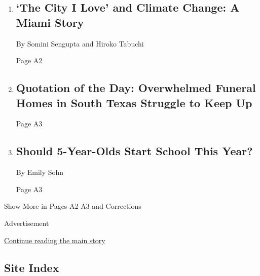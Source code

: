 \begin{enumerate}
\def\labelenumi{\arabic{enumi}.}
\item
  \href{/2020/07/15/climate/nyt-climate-newsletter-miami.html}{}

  \hypertarget{the-city-i-love-and-climate-change-a-miami-story}{%
  \subsection{`The City I Love' and Climate Change: A Miami
  Story}\label{the-city-i-love-and-climate-change-a-miami-story}}

  By Somini Sengupta and Hiroko Tabuchi

  Page A2
\item
  \href{/2020/07/28/todayspaper/quotation-of-the-day-overwhelmed-funeral-homes-in-south-texas-struggle-to-keep-up.html}{}

  \hypertarget{quotation-of-the-day-overwhelmed-funeral-homes-in-south-texas-struggle-to-keep-up}{%
  \subsection{Quotation of the Day: Overwhelmed Funeral Homes in South
  Texas Struggle to Keep
  Up}\label{quotation-of-the-day-overwhelmed-funeral-homes-in-south-texas-struggle-to-keep-up}}

  Page A3
\item
  \href{/2020/07/23/parenting/school-opening-kindergarten-coronavirus.html}{}

  \hypertarget{should-5-year-olds-start-school-this-year}{%
  \subsection{Should 5-Year-Olds Start School This
  Year?}\label{should-5-year-olds-start-school-this-year}}

  By Emily Sohn

  Page A3
\end{enumerate}

Show More in Pages A2-A3 and Corrections

Advertisement

\protect\hyperlink{after-mid6}{Continue reading the main story}

\hypertarget{site-index}{%
\subsection{Site Index}\label{site-index}}

